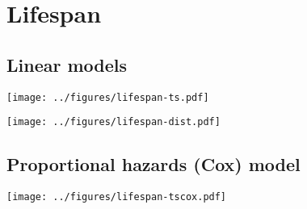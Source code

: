 \documentclass[10pt]{article}
\begin{document}
\section{Lifespan}

\subsection{Linear models}

\begin{center}
    \texttt{[image: ../figures/lifespan-ts.pdf]}
\end{center}
\begin{center}
    \texttt{[image: ../figures/lifespan-dist.pdf]}
\end{center}

\begin{minipage}{\linewidth}\end{minipage}

\subsection{Proportional hazards (Cox) model}

\begin{center}
    \texttt{[image: ../figures/lifespan-tscox.pdf]}
\end{center}

\begin{minipage}{\linewidth}\end{minipage}
\end{document}
